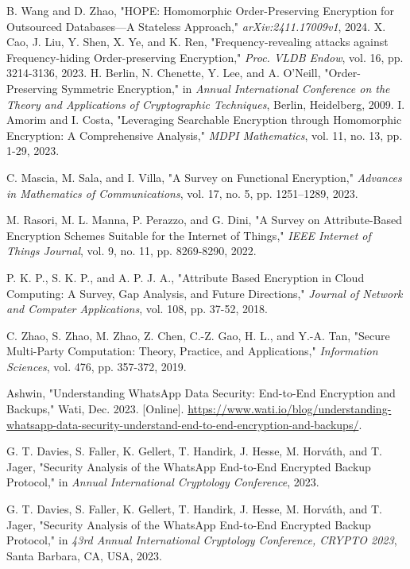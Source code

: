 \documentclass[conference]{IEEEtran}
\begin{document}
\begin{thebibliography}{00}
 B. Wang and D. Zhao, "HOPE: Homomorphic Order-Preserving Encryption for Outsourced Databases—A Stateless Approach," \textit{arXiv:2411.17009v1}, 2024.
 X. Cao, J. Liu, Y. Shen, X. Ye, and K. Ren, "Frequency-revealing attacks against Frequency-hiding Order-preserving Encryption," \textit{Proc. VLDB Endow}, vol. 16, pp. 3214-3136, 2023.
 H. Berlin, N. Chenette, Y. Lee, and A. O’Neill, "Order-Preserving Symmetric Encryption," in \textit{Annual International Conference on the Theory and Applications of Cryptographic Techniques}, Berlin, Heidelberg, 2009.
 I. Amorim and I. Costa, "Leveraging Searchable Encryption through Homomorphic Encryption: A Comprehensive Analysis," \textit{MDPI Mathematics}, vol. 11, no. 13, pp. 1-29, 2023.

 C. Mascia, M. Sala, and I. Villa, "A Survey on Functional Encryption," \textit{Advances in Mathematics of Communications}, vol. 17, no. 5, pp. 1251–1289, 2023.

 M. Rasori, M. L. Manna, P. Perazzo, and G. Dini, "A Survey on Attribute-Based Encryption Schemes Suitable for the Internet of Things," \textit{IEEE Internet of Things Journal}, vol. 9, no. 11, pp. 8269-8290, 2022.

 P. K. P., S. K. P., and A. P. J. A., "Attribute Based Encryption in Cloud Computing: A Survey, Gap Analysis, and Future Directions," \textit{Journal of Network and Computer Applications}, vol. 108, pp. 37-52, 2018.

 C. Zhao, S. Zhao, M. Zhao, Z. Chen, C.-Z. Gao, H. L., and Y.-A. Tan, "Secure Multi-Party Computation: Theory, Practice, and Applications," \textit{Information Sciences}, vol. 476, pp. 357-372, 2019.

 Ashwin, "Understanding WhatsApp Data Security: End-to-End Encryption and Backups," Wati, Dec. 2023. [Online].
\url{https://www.wati.io/blog/understanding-whatsapp-data-security-understand-end-to-end-encryption-and-backups/}.

 G. T. Davies, S. Faller, K. Gellert, T. Handirk, J. Hesse, M. Horváth, and T. Jager, "Security Analysis of the WhatsApp End-to-End Encrypted Backup Protocol," in \textit{Annual International Cryptology Conference}, 2023.

 G. T. Davies, S. Faller, K. Gellert, T. Handirk, J. Hesse, M. Horváth, and T. Jager, "Security Analysis of the WhatsApp End-to-End Encrypted Backup Protocol," in \textit{43rd Annual International Cryptology Conference, CRYPTO 2023}, Santa Barbara, CA, USA, 2023.


\end{thebibliography}
\end{document}

